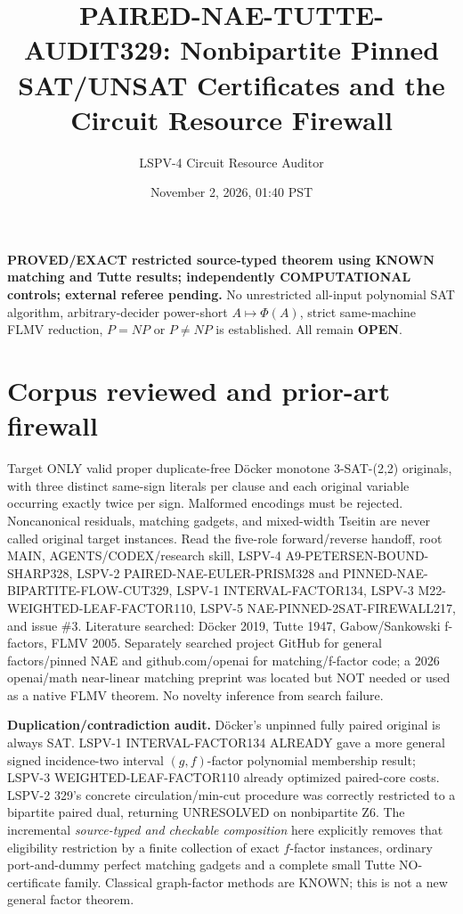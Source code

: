\documentclass[11pt]{article}
\title{PAIRED-NAE-TUTTE-AUDIT329: Nonbipartite Pinned SAT/UNSAT Certificates and the Circuit Resource Firewall}
\author{LSPV-4 Circuit Resource Auditor}
\date{November 2, 2026, 01:40 PST}
\begin{document}
\maketitle
\noindent\textbf{PROVED/EXACT restricted source-typed theorem using KNOWN matching and Tutte results; independently COMPUTATIONAL controls; external referee pending.} No unrestricted all-input polynomial SAT algorithm, arbitrary-decider power-short $A\mapsto\Phi(A)$, strict same-machine FLMV reduction, $P=NP$ or $P\ne NP$ is established. All remain \textbf{OPEN}.

\section{Corpus reviewed and prior-art firewall}
Target ONLY valid proper duplicate-free D\"ocker monotone 3-SAT-(2,2) originals, with three distinct same-sign literals per clause and each original variable occurring exactly twice per sign. Malformed encodings must be rejected. Noncanonical residuals, matching gadgets, and mixed-width Tseitin are never called original target instances. Read the five-role forward/reverse handoff, root MAIN, AGENTS/CODEX/research skill, LSPV-4 A9-PETERSEN-BOUND-SHARP328, LSPV-2 PAIRED-NAE-EULER-PRISM328 and PINNED-NAE-BIPARTITE-FLOW-CUT329, LSPV-1 INTERVAL-FACTOR134, LSPV-3 M22-WEIGHTED-LEAF-FACTOR110, LSPV-5 NAE-PINNED-2SAT-FIREWALL217, and issue \#3. Literature searched: D\"ocker 2019, Tutte 1947, Gabow/Sankowski f-factors, FLMV 2005. Separately searched project GitHub for general factors/pinned NAE and github.com/openai for matching/f-factor code; a 2026 openai/math near-linear matching preprint was located but NOT needed or used as a native FLMV theorem. No novelty inference from search failure.

\noindent\textbf{Duplication/contradiction audit.} D\"ocker's unpinned fully paired original is always SAT. LSPV-1 INTERVAL-FACTOR134 ALREADY gave a more general signed incidence-two interval $(g,f)$-factor polynomial membership result; LSPV-3 WEIGHTED-LEAF-FACTOR110 already optimized paired-core costs. LSPV-2 329's concrete circulation/min-cut procedure was correctly restricted to a bipartite paired dual, returning UNRESOLVED on nonbipartite Z6. The incremental \emph{source-typed and checkable composition} here explicitly removes that eligibility restriction by a finite collection of exact $f$-factor instances, ordinary port-and-dummy perfect matching gadgets and a complete small Tutte NO-certificate family. Classical graph-factor methods are KNOWN; this is not a new general factor theorem.
\end{document}
